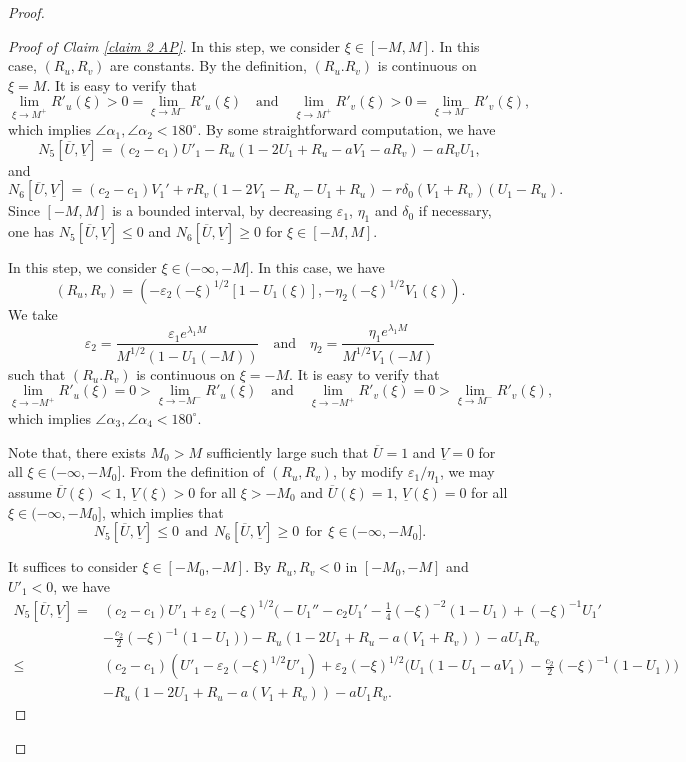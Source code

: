 \documentclass[11pt,a4paper]{article}
\numberwithin{equation}{section}
\numberwithin{figure}{section}
\begin{document}
\begin{proof}
\begin{proof}[Proof of Claim \ref{claim 2 AP}]
In this step, we consider $\xi\in[-M,M]$. In this case, $(R_u,R_v)$ are constants. By the definition, $(R_u.R_v)$ is continuous on $\xi=M$. It is easy to verify that 
$$\lim_{\xi\to M^+}R'_u(\xi)>0=\lim_{\xi\to M^-}R'_u(\xi)\quad\text{and}\quad \lim_{\xi\to M^+}R'_v(\xi)>0=\lim_{\xi\to M^-}R'_v(\xi),$$
which implies $\angle \alpha_1,\angle \alpha_2<180^{\circ}$. 
By some straightforward computation, we have 
 \begin{equation*}
N_5[\overline U,\underline V]=(c_2-c_1)U'_1-R_u(1-2U_1+R_u-aV_1-aR_v)-aR_vU_1,
\end{equation*}
and
\begin{equation*}
N_6[\overline U,\underline V] = (c_2-c_1)V_1'+ rR_v(1-2V_1-R_v-U_1+R_u)-r\delta_0(V_1+R_v)(U_1-R_u).
\end{equation*}
Since $[-M,M]$ is a bounded interval, by decreasing $\varepsilon_1$, $\eta_1$ and $\delta_0$ if necessary, one has $N_5[\overline U,\underline V]\le 0$ and 
$N_6[\overline U,\underline V]\ge 0$ for $\xi\in[-M,M]$.

In this step, we consider $\xi\in(-\infty,-M]$. In this case, we have 
$$(R_u,R_v)=(-\varepsilon_2(-\xi)^{1/2}[1-U_1(\xi)],-\eta_2(-\xi)^{1/2}V_1(\xi)).$$  
We take  
$$\varepsilon_2=\frac{\varepsilon_1e^{\lambda_1 M}}{M^{1/2}(1-U_1(-M))}\quad\text{and}\quad\eta_2=\frac{\eta_1e^{\lambda_1 M}}{M^{1/2}V_1(-M)}$$
such that $(R_u.R_v)$ is continuous on $\xi=-M$. It is easy to verify that 
$$\lim_{\xi\to -M^+}R'_u(\xi)=0>\lim_{\xi\to -M^-}R'_u(\xi)\quad\text{and}\quad \lim_{\xi\to -M^+}R'_v(\xi)=0>\lim_{\xi\to M^-}R'_v(\xi),$$
which implies $\angle \alpha_3,\angle \alpha_4<180^{\circ}$. 


Note that, there exists $M_0>M$ sufficiently large such that $\overline U=1$ and $\underline V=0$ for all $\xi\in(-\infty,-M_0]$. 
From the definition of $(R_u,R_v)$, by modify $\varepsilon_1/\eta_1$, we may assume $\overline U(\xi)<1$, $\underline V(\xi)>0$ for all $\xi>-M_0$ and 
$\overline U(\xi)=1$, $\underline V(\xi)=0$ for all $\xi\in(-\infty,-M_0]$, which implies that
$$N_5[\overline U,\underline V]\le 0\ \ \text{and}\ \ N_6[\overline U,\underline V]\ge 0\ \ \text{for}\ \ \xi\in(-\infty,-M_0].$$

It suffices to consider $\xi\in[-M_0,-M]$. 
By $R_u,R_v<0$ in $[-M_0,-M]$ and $U'_1<0$, we have 
\begin{equation}\label{N3 inequalifty -infty}
\begin{aligned}
N_5[\overline U,\underline V]=&(c_2-c_1)U'_1+\varepsilon_2(-\xi)^{1/2}\Big(-U_1''-c_2U_1'-\frac{1}{4}(-\xi)^{-2}(1-U_1)+(-\xi)^{-1}U_1'\\&-\frac{c_2}{2}(-\xi)^{-1}(1-U_1)\Big)
-R_u(1-2U_1+R_u-a(V_1+R_v))-aU_1R_v\\
\leq&(c_2-c_1)(U'_1-\varepsilon_2(-\xi)^{1/2}U'_1)+\varepsilon_2(-\xi)^{1/2}\Big(U_1(1-U_1-aV_1)-\frac{c_2}{2}(-\xi)^{-1}(1-U_1)\Big)\\&-R_u(1-2U_1+R_u-a(V_1+R_v))-aU_1R_v.
\end{aligned}
\end{equation}


\end{proof}
\end{proof}
\end{document}

